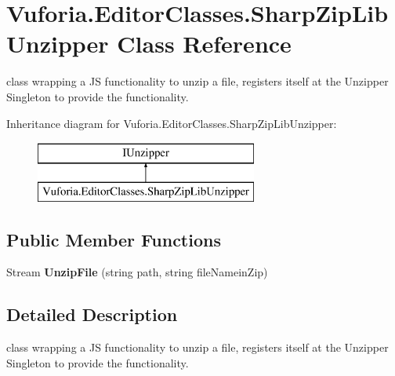 \hypertarget{class_vuforia_1_1_editor_classes_1_1_sharp_zip_lib_unzipper}{}\section{Vuforia.\+Editor\+Classes.\+Sharp\+Zip\+Lib\+Unzipper Class Reference}
\label{class_vuforia_1_1_editor_classes_1_1_sharp_zip_lib_unzipper}


class wrapping a J\+S functionality to unzip a file, registers itself at the Unzipper Singleton to provide the functionality.  


Inheritance diagram for Vuforia.\+Editor\+Classes.\+Sharp\+Zip\+Lib\+Unzipper\+:\begin{figure}[H]
\begin{center}
\leavevmode
\includegraphics[height=2.000000cm]{class_vuforia_1_1_editor_classes_1_1_sharp_zip_lib_unzipper}
\end{center}
\end{figure}
\subsection*{Public Member Functions}
\begin{DoxyCompactItemize}
\item 
\hypertarget{class_vuforia_1_1_editor_classes_1_1_sharp_zip_lib_unzipper_a1b4f0a275da2ed076fc4a08dc8527869}{}Stream {\bfseries Unzip\+File} (string path, string file\+Namein\+Zip)\label{class_vuforia_1_1_editor_classes_1_1_sharp_zip_lib_unzipper_a1b4f0a275da2ed076fc4a08dc8527869}

\end{DoxyCompactItemize}


\subsection{Detailed Description}
class wrapping a J\+S functionality to unzip a file, registers itself at the Unzipper Singleton to provide the functionality. 

